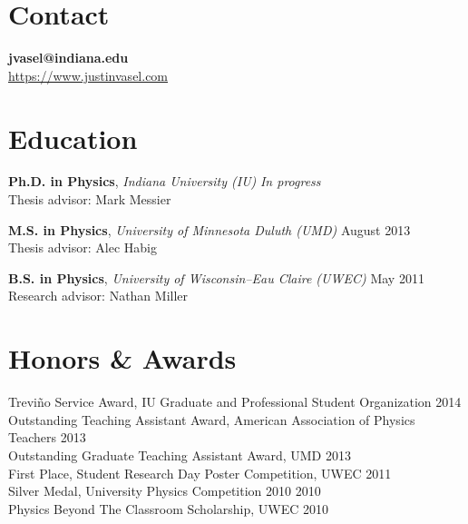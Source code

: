 \documentclass[11pt]{cv}
\begin{document}

\begin{cv}


\section{Contact}
\textbf{jvasel@indiana.edu} \\
\href{https://www.justinvasel.com}{https://www.justinvasel.com}


\section{Education}

\textbf{Ph.D. in Physics}, \emph{Indiana University (IU)} \hfill \emph{In progress} \\
Thesis advisor: Mark Messier

\textbf{M.S. in Physics}, \emph{University of Minnesota Duluth (UMD)} \hfill August 2013 \\
Thesis advisor: Alec Habig

\textbf{B.S. in Physics}, \emph{University of Wisconsin--Eau Claire (UWEC)} \hfill May 2011 \\
Research advisor: Nathan Miller


\section{Honors \& Awards}

Trevi\~{n}o Service Award, IU Graduate and Professional Student Organization \hfill 2014 \\
Outstanding Teaching Assistant Award, American Association of Physics Teachers \hfill 2013 \\
Outstanding Graduate Teaching Assistant Award, UMD \hfill 2013 \\
First Place, Student Research Day Poster Competition, UWEC \hfill 2011 \\
Silver Medal, University Physics Competition 2010 \hfill 2010 \\
Physics Beyond The Classroom Scholarship, UWEC \hfill 2010



\end{cv}
\end{document}
